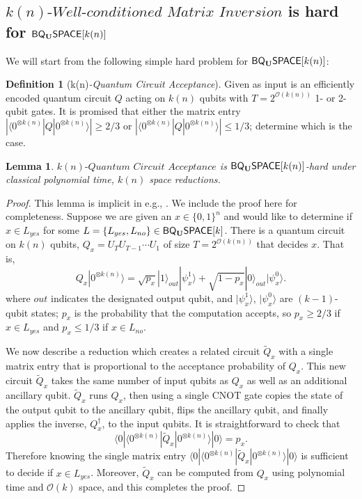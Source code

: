 \documentclass[11pt]{article}
\newtheorem{lemma}{Lemma}
\theoremstyle{definition}
\theoremstyle{remark}
\theoremstyle{definition}
\newtheorem{definition}{Definition}
\newcommand\matrixinvert[1]{{\ensuremath{#1}}\textit{-Well-conditioned Matrix Inversion}}
\newcommand\qca[1]{#1\textit{-Quantum Circuit Acceptance}}
\newcommand{\zero}{\ensuremath{0^{\otimes{k(n)}}}}
\newcommand{\classfont}{\sf}
\newcommand{\Unitary}{\mathbf{U}}
\newcommand{\unitaryBQSPACE}[1]{{\classfont{BQ}_\Unitary\classfont{SPACE}}[#1]}
\begin{document}
\subsection{$\matrixinvert{k(n)}$ is hard for $\unitaryBQSPACE{k(n)}$}
We will start from the following simple hard problem for $\unitaryBQSPACE{k(n)}$:
\begin{definition}[\qca{k(n)}]
	Given as input is an efficiently encoded quantum circuit $Q$ acting on $k(n)$ qubits with $T = 2^{\mathcal{O}(k(n))}$ 1- or 2-qubit gates.  It is promised that either the matrix entry $|\langle {\zero}|Q|{\zero}\rangle| \geq 2/3$ or $|\langle {\zero}|Q|{\zero}\rangle| \leq 1/3$; determine which is the case.
\end{definition}
\begin{lemma}
	$\qca{k(n)}$ is $\unitaryBQSPACE{k(n)}$-hard under classical polynomial time, $k(n)$ space reductions.
\end{lemma}
\begin{proof}
This lemma is implicit in e.g., \cite{bbbv,dawsonnielsen}.  We include the proof here for completeness.  Suppose we are given an $x\in \{0,1\}^n$ and would like to determine if $x\in L_{yes}$ for some $L=\{L_{yes},L_{no}\}\in\unitaryBQSPACE{k}$.  There is a quantum circuit on $k(n)$ qubits, $Q_x=U_TU_{T-1}\cdots U_1$ of size $T=2^{\mathcal{O}(k(n))}$ that decides $x$.  That is, 
\begin{equation}
Q_x|\zero\rangle = \sqrt{p_x} |1\rangle_{out}|\psi_x^1\rangle + \sqrt{1-p_x} |0\rangle_{out} |\psi_x^0\rangle.
\end{equation}
where $out$ indicates the designated output qubit, and $|\psi_x^1\rangle$, $|\psi_x^0\rangle$ are $(k-1)$-qubit states; $p_x$ is the probability that the computation accepts, so $p_x \ge 2/3$ if $x \in L_{yes}$ and $p_x \le 1/3$ if $x \in L_{no}$.

We now describe a reduction which creates a related circuit $\tilde{Q}_x$ with a single matrix entry that is proportional to the acceptance probability of $Q_x$.  This new circuit $\tilde{Q}_x$ takes the same number of input qubits as $Q_x$ as well as an additional ancillary qubit.  $\tilde{Q}_x$ runs $Q_x$, then using a single CNOT gate copies the state of the output qubit to the ancillary qubit, flips the ancillary qubit, and finally applies the inverse, $Q_x^{\dagger}$, to the input qubits. It is straightforward to check that
\begin{equation}
\langle 0|\langle \zero|\tilde{Q}_x|\zero\rangle|0\rangle = p_x.
\end{equation}
Therefore knowing the single matrix entry $\langle 0|\langle \zero|\tilde{Q}_x|\zero\rangle|0\rangle$ is sufficient to decide if $x \in L_{yes}$. Moreover, $\tilde{Q}_x$ can be computed from $Q_x$ using polynomial time and $\mathcal{O}(k)$ space, and this completes the proof.
\end{proof}
\end{document}
